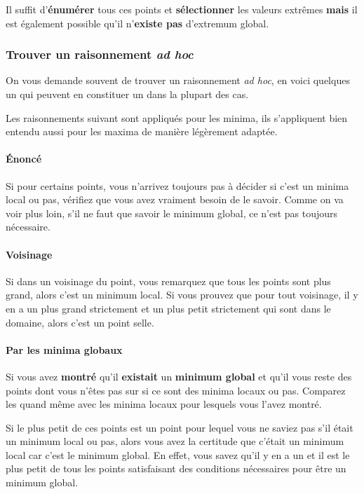 \documentclass[11pt,a4paper]{article}
\theoremstyle{definition}
\begin{document}
Il suffit d'\textbf{énumérer} tous ces points et \textbf{sélectionner} les valeurs extrêmes
\textbf{mais} il est également possible qu'il n'\textbf{existe pas} d'extremum global.

\subsubsection{Trouver un raisonnement \emph{ad hoc}}
On vous demande souvent de trouver un raisonnement \emph{ad hoc}, en voici quelques un qui peuvent en constituer un dans la plupart des cas.

Les raisonnements suivant sont appliqués pour les minima, ils s'appliquent bien entendu aussi pour les maxima de manière légèrement adaptée.

\paragraph{Énoncé}
Si pour certains points, vous n'arrivez toujours pas à décider si c'est un minima local ou pas,
vérifiez que vous avez vraiment besoin de le savoir.
Comme on va voir plus loin, s'il ne faut que savoir le minimum global, ce n'est pas toujours nécessaire.

\paragraph{Voisinage}
Si dans un voisinage du point, vous remarquez que tous les points sont plus grand, alors c'est un minimum local.
Si vous prouvez que pour tout voisinage, il y en a un plus grand strictement et un plus petit strictement qui sont dans le domaine,
alors c'est un point selle.

\paragraph{Par les minima globaux}
Si vous avez \textbf{montré} qu'il \textbf{existait} un \textbf{minimum global}
et qu'il vous reste des points dont vous n'êtes pas sur si ce sont des minima locaux ou pas.
Comparez les quand même avec les minima locaux pour lesquels vous l'avez montré.

Si le plus petit de ces points est un point pour lequel vous ne saviez pas s'il était un minimum local ou pas,
alors vous avez la certitude que c'était un minimum local car c'est le minimum global.
En effet, vous savez qu'il y en a un
et il est le plus petit de tous les points satisfaisant des conditions nécessaires pour être un minimum global.
\end{document}
